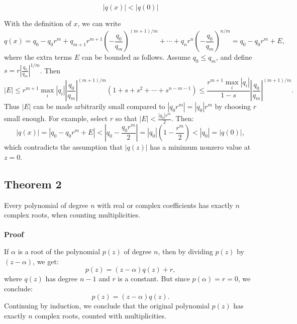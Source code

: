 \[|q(x)| < |q(0)|\]

With the definition of \(x\), we can write
\[
	q(x) = q_0 - q_0 r^m + q_{m+1} r^{m+1} \left(-\frac{q_0}{q_m}\right)^{(m+1)/m} + \cdots + q_n r^n \left(-\frac{q_0}{q_m}\right)^{n/m} = q_0 - q_0 r^m + E,
\]
where the extra terms \(E\) can be bounded as follows. Assume \(q_0 \leq q_m\), and define \(s = r \left|\frac{q_0}{q_m}\right|^{1/m}\). Then
\[
	|E| \leq r^{m+1} \max_i |q_i| \left|\frac{q_0}{q_m}\right|^{(m+1)/m} (1 + s + s^2 + \cdots + s^{n - m - 1}) \leq \frac{r^{m+1} \max_i |q_i|}{1 - s} \left|\frac{q_0}{q_m}\right|^{(m+1)/m}.
\]
Thus \(|E|\) can be made arbitrarily small compared to \(|q_0 r^m| = |q_0| r^m\) by choosing \(r\) small enough. For example, select \(r\) so that \(|E| < \frac{|q_0| r^m}{2}\). Then:
\[
	|q(x)| = |q_0 - q_0 r^m + E| < |q_0 - \frac{q_0 r^m}{2}| = |q_0| \left(1 - \frac{r^m}{2}\right) < |q_0| = |q(0)|,
\]
which contradicts the assumption that \(|q(z)|\) has a minimum nonzero value at \(z = 0\).
\QED

\subsection{Theorem 2}
Every polynomial of degree \(n\) with real or complex coefficients has exactly \(n\) complex roots, when counting multiplicities.
\\\\
\textbf{Proof}

If \(\alpha\) is a root of the polynomial \(p(z)\) of degree \(n\), then by dividing \(p(z)\) by \((z - \alpha)\), we get:
\[
	p(z) = (z - \alpha) q(z) + r,
\]
where \(q(z)\) has degree \(n - 1\) and \(r\) is a constant. But since \(p(\alpha) = r = 0\), we conclude:
\[
	p(z) = (z - \alpha) q(z).
\]
Continuing by induction, we conclude that the original polynomial \(p(z)\) has exactly \(n\) complex roots, counted with multiplicities.

\QED
\newpage
